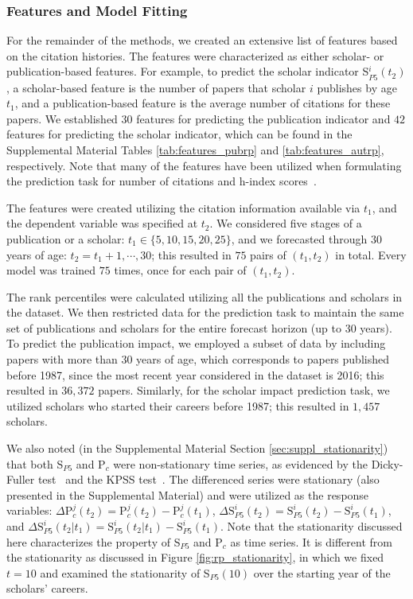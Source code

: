 \subsubsection*{Features and Model Fitting}

For the remainder of the methods, we created an extensive list of features based on the citation histories. The features were characterized as either scholar- or publication-based features. For example, to predict the scholar indicator S$_{P5}^{i}(t_2)$, a scholar-based feature is the number of papers that scholar $i$ publishes by age $t_1$, and a publication-based feature is the average number of citations for these papers. We established $30$ features for predicting the publication indicator and $42$ features for predicting the scholar indicator, which can be found in the Supplemental Material Tables \ref{tab:features_pubrp} and \ref{tab:features_autrp}, respectively. Note that many of the features have been utilized when formulating the prediction task for number of citations and h-index scores~\cite{acuna2012future,weihs2017learning,weis2021learning}.

The features were created utilizing the citation information available via $t_1$, and the dependent variable was specified at $t_2$. We considered five stages of a publication or a scholar: $t_1\in\{5,10,15,20,25\}$, and we forecasted through $30$ years of age: $t_2=t_1+1,\cdots,30$; this resulted in $75$ pairs of $(t_1,t_2)$ in total. Every model was trained $75$ times, once for each pair of $(t_1,t_2)$.

The rank percentiles were calculated utilizing all the publications and scholars in the dataset. We then restricted data for the prediction task to maintain the same set of publications and scholars for the entire forecast horizon (up to 30 years). To predict the publication impact, we employed a subset of data by including papers with more than $30$ years of age, which corresponds to papers published before 1987, since the most recent year considered in the dataset is 2016; this resulted in $36,372$ papers. Similarly, for the scholar impact prediction task, we utilized scholars who started their careers before 1987; this resulted in $1,457$ scholars. 

We also noted (in the Supplemental Material Section \ref{sec:suppl_stationarity}) that both S$_{P5}$ and P$_c$ were non-stationary time series, as evidenced by the Dicky-Fuller test~\cite{dickey1979distribution} and the KPSS test~\cite{kwiatkowski1992testing}. The differenced series were stationary (also presented in the Supplemental Material) and were utilized as the response variables: $\Delta \text{P}_{c}^{j}(t_2) = \text{P}_{c}^{j}(t_2) - \text{P}_{c}^{j}(t_1)$, $\Delta \text{S}_{P5}^{i}(t_2) = \text{S}_{P5}^{i}(t_2) - \text{S}_{P5}^{i}(t_1)$, and $\Delta \text{S}_{P5}^{i}(t_2|t_1) = \text{S}_{P5}^{i}(t_2|t_1) - \text{S}_{P5}^{i}(t_1)$. Note that the stationarity discussed here characterizes the property of S$_{P5}$ and P$_c$ as time series. It is different from the stationarity as discussed in Figure \ref{fig:rp_stationarity}, in which we fixed $t=10$ and examined the stationarity of S$_{P5}(10)$ over the starting year of the scholars' careers.

